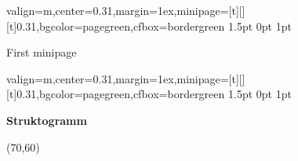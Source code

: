\documentclass[11pt, a4paper, landscape]{article}
\newcommand{\fancyheader}[1]{
	\centerline{\sffamily \textbf{ \large #1}}
}
\newenvironment{fancybox}[2]
{
	\begin{adjustbox}{valign=m,center=0.31\textwidth,margin=1ex,minipage=[t][][t]{0.31\textwidth},bgcolor=#1,cfbox=#2 1.5pt 0pt 1pt}
	\begin{centering}
}
{
	\end{centering}
	\end{adjustbox}
}
\begin{document}
\begin{multicols}{3}
\begin{fancybox}{pagegreen}{bordergreen}
	First minipage
\end{fancybox}

\begin{fancybox}{pagegreen}{bordergreen}
\fancyheader{Struktogramm}

\begin{struktogramm}(70,60)
			\change
		\ifend
		\change
	\ifend
\end{struktogramm}

\end{fancybox}


\end{multicols}
\end{document}
